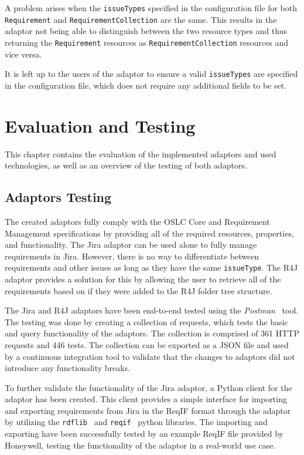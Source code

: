 A problem arises when the \texttt{issueTypes} specified in the configuration file for both \texttt{Requirement} and \texttt{RequirementCollection} are the same. This results in the adaptor not being able to distinguish between the two resource types and thus returning the \texttt{Requirement} resources as \texttt{RequirementCollection} resources and vice versa.

It is left up to the users of the adaptor to ensure a valid \texttt{issueTypes} are specified in the configuration file, which does not require any additional fields to be set.


\chapter{Evaluation and Testing}
\label{chapter:evaluation}
This chapter contains the evaluation of the implemented adaptors and used technologies, as well as an overview of the testing of both adaptors.

\section{Adaptors Testing}
The created adaptors fully comply with the OSLC Core and Requirement Management specifications by providing all of the required resources, properties, and functionality. The Jira adaptor can be used alone to fully manage requirements in Jira. However, there is no way to differentiate between requirements and other issues as long as they have the same \texttt{issueType}. The R4J adaptor provides a solution for this by allowing the user to retrieve all of the requirements based on if they were added to the R4J folder tree structure.

The Jira and R4J adaptors have been end-to-end tested using the \emph{Postman} \cite{postman} tool. The testing was done by creating a collection of requests, which tests the basic and query functionality of the adaptors. The collection is comprised of 361 HTTP requests and 446 tests. The collection can be exported as a JSON file and used by a continuous integration tool to validate that the changes to adaptors did not introduce any functionality breaks.

To further validate the functionality of the Jira adaptor, a Python client for the adaptor has been created. This client provides a simple interface for importing and exporting requirements from Jira in the ReqIF format through the adaptor by utilizing the \texttt{rdflib} \cite{python_rdflib} and \texttt{reqif} \cite{python_reqif} python libraries. The importing and exporting have been successfully tested by an example ReqIF file provided by Honeywell, testing the functionality of the adaptor in a real-world use case.



